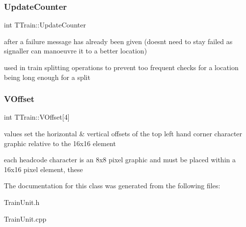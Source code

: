 \subsubsection{\texorpdfstring{Update\+Counter}{UpdateCounter}}
{\footnotesize\ttfamily int T\+Train\+::\+Update\+Counter\hspace{0.3cm}{\ttfamily [private]}}



after a failure message has already been given (doesn\textquotesingle{}t need to stay failed as signaller can manoeuvre it to a better location) 

used in train splitting operations to prevent too frequent checks for a location being long enough for a split \mbox{\label{class_t_train_a4c8b153a620229a3d9cc54f64ffa5f4a}} 
\subsubsection{\texorpdfstring{V\+Offset}{VOffset}}
{\footnotesize\ttfamily int T\+Train\+::\+V\+Offset\mbox{[}4\mbox{]}\hspace{0.3cm}{\ttfamily [private]}}



values set the horizontal \& vertical offsets of the top left hand corner character graphic relative to the 16x16 element 

each headcode character is an 8x8 pixel graphic and must be placed within a 16x16 pixel element, these 

The documentation for this class was generated from the following files\+:\begin{DoxyCompactItemize}
\item 
Train\+Unit.\+h\item 
Train\+Unit.\+cpp\end{DoxyCompactItemize}
